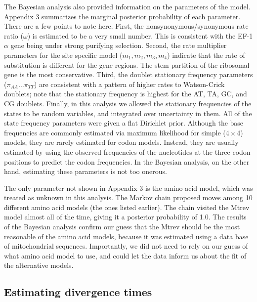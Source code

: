 \documentclass{svmult}
\begin{document}
The Bayesian analysis also provided information on the parameters of the model. Appendix 3
summarizes the marginal posterior probability of each parameter. There are a few points to note
here. First, the nonsynonymous/synonymous rate ratio ($\omega$) is estimated to be a very small
number. This is consistent with the EF-1$\alpha$ gene being under strong purifying selection.
Second, the rate multiplier parameters for the site specific model ($m_1, m_2, m_3, m_4$) indicate
that the rate of substitution is different for the gene regions. The stem partition of the
ribosomal gene is the most conservative. Third, the doublet stationary frequency parameters
($\pi_{AA} \ldots \pi_{TT}$) are consistent with a pattern of higher rates to Watson-Crick
doublets; note that the stationary frequency is highest for the AT, TA, GC, and CG doublets.
Finally, in this analysis we allowed the stationary frequencies of the states to be random
variables, and integrated over uncertainty in them. All of the state frequency parameters were
given a flat Dirichlet prior. Although the base frequencies are commonly estimated via maximum
likelihood for simple ($4 \times 4$) models, they are rarely estimated for codon models.  Instead,
they are usually estimated by using the observed frequencies of the nucleotides at the three codon
positions to predict the codon frequencies. In the Bayesian analysis, on the other hand, estimating
these parameters is not too onerous.

The only parameter not shown in Appendix 3 is the amino acid model, which was treated as unknown in
this analysis. The Markov chain proposed moves among 10 different amino acid models (the ones
listed earlier). The chain visited the Mtrev model almost all of the time, giving it a posterior
probability of 1.0. The results of the Bayesian analysis confirm our guess that the Mtrev should be
the most reasonable of the amino acid models, because it was estimated using a data base of
mitochondrial sequences. Importantly, we did not need to rely on our guess of what amino acid model
to use, and could let the data inform us about the fit of the alternative models.

\subsection{Estimating divergence times}
\end{document}

